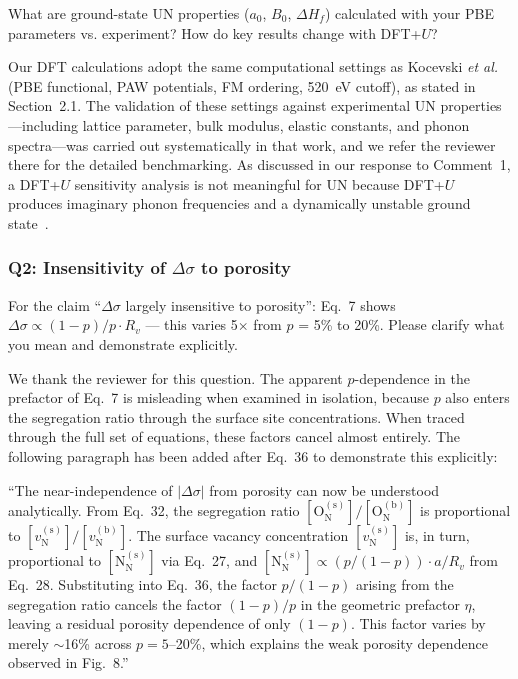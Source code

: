 \documentclass[12pt]{article}
\begin{document}
\color{blue}

What are ground-state UN properties ($a_0$, $B_0$, $\Delta H_f$) calculated with your PBE parameters vs. experiment? How do key results change with DFT+$U$?\\

\color{black}


Our DFT calculations adopt the same computational settings as Kocevski \textit{et al.}~\cite{Kocevski2022I} (PBE functional, PAW potentials, FM ordering, 520~eV cutoff), as stated in Section~2.1. The validation of these settings against experimental UN properties---including lattice parameter, bulk modulus, elastic constants, and phonon spectra---was carried out systematically in that work, and we refer the reviewer there for the detailed benchmarking. As discussed in our response to Comment~1, a DFT+$U$ sensitivity analysis is not meaningful for UN because DFT+$U$ produces imaginary phonon frequencies and a dynamically unstable ground state~\cite{Kocevski2022I}.

\subsubsection*{Q2: Insensitivity of $\Delta \sigma$ to porosity}

\color{blue}
For the claim ``$\Delta \sigma$ largely insensitive to porosity'': Eq.~7 shows $\Delta \sigma \propto (1-p)/p \cdot R_v$ --- this varies 5$\times$ from $p$ = 5\% to 20\%. Please clarify what you mean and demonstrate explicitly.\\
\color{black}


We thank the reviewer for this question. The apparent $p$-dependence in the prefactor of Eq.~7 is misleading when examined in isolation, because $p$ also enters the segregation ratio through the surface site concentrations. When traced through the full set of equations, these factors cancel almost entirely. The following paragraph has been added after Eq.~36 to demonstrate this explicitly:

\color{red}


``The near-independence of $|\Delta \sigma|$ from porosity can now be understood analytically. From Eq.~32, the segregation ratio $[\text{O}_\text{N}^{(\text{s})}] / [\text{O}_\text{N}^{(\text{b})}]$ is proportional to $[v_\text{N}^{(\text{s})}] / [v_\text{N}^{(\text{b})}]$. The surface vacancy concentration $[v_\text{N}^{(\text{s})}]$ is, in turn, proportional to $[\text{N}_\text{N}^{(\text{s})}]$ via Eq.~27, and $[\text{N}_\text{N}^{(\text{s})}] \propto (p/(1-p)) \cdot a/R_v$ from Eq.~28. Substituting into Eq.~36, the factor $p/(1-p)$ arising from the segregation ratio cancels the factor $(1-p)/p$ in the geometric prefactor $\eta$, leaving a residual porosity dependence of only $(1-p)$. This factor varies by merely $\sim$16\% across $p = 5$--20\%, which explains the weak porosity dependence observed in Fig.~8.''
\end{document}
